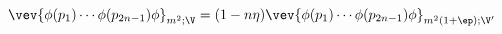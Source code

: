 \begin{equation}
\vev{\phi (p_1) \cdots \phi (p_{2n-1}) \phi}_{m^2; \V}
= (1 - n \eta) \vev{\phi (p_1) \cdots \phi (p_{2n-1}) \phi}_{m^2
(1+\ep); \V'}
\end{equation}

